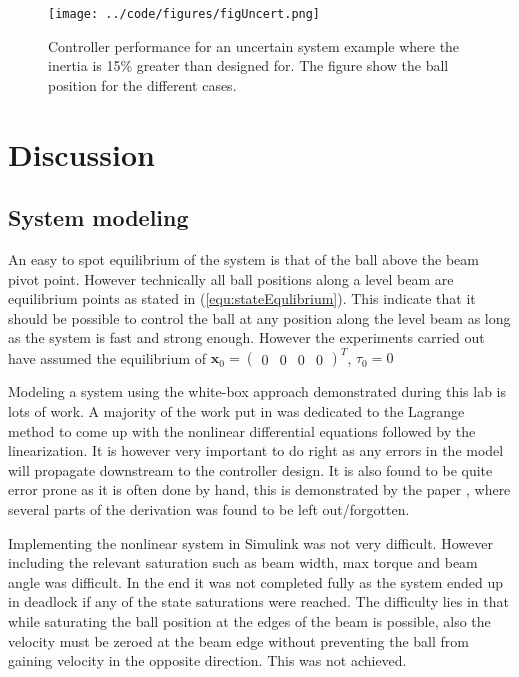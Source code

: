 \documentclass[a4paper, titlepage]{article}
\begin{document}
\begin{figure}[H]
\center
\texttt{[image: ../code/figures/figUncert.png]}
\caption{Controller performance for an uncertain system example where the inertia is 15\% greater than designed for. The figure show the ball position for the different cases.}
\label{fig:uncert}
\end{figure}


\section{Discussion}
\subsection{System modeling}
An easy to spot equilibrium of the system is that of the ball above the beam pivot point.
However technically all ball positions along a level beam are equilibrium points as stated in (\ref{equ:stateEqulibrium}).
This indicate that it should be possible to control the ball at any position along the level beam as long as the system is fast and strong enough.
However the experiments carried out have assumed the equilibrium of $\textbf{x}_0 = \begin{pmatrix} 0 & 0 & 0 & 0 \end{pmatrix}^T$, $\tau_0 = 0$


Modeling a system using the white-box approach demonstrated during this lab is lots of work.
A majority of the work put in was dedicated to the Lagrange method to come up with the nonlinear differential equations followed by the linearization.
It is however very important to do right as any errors in the model will propagate downstream to the controller design.
It is also found to be quite error prone as it is often done by hand, this is demonstrated by the paper \citep{BolvarVincenty2014ModellingTB}, where several parts of the derivation was found to be left out/forgotten.

Implementing the nonlinear system in Simulink was not very difficult.
However including the relevant saturation such as beam width, max torque and beam angle was difficult.
In the end it was not completed fully as the system ended up in deadlock if any of the state saturations were reached.
The difficulty lies in that while saturating the ball position at the edges of the beam is possible, also the velocity must be zeroed at the beam edge without preventing the ball from gaining velocity in the opposite direction.
This was not achieved.
\end{document}
